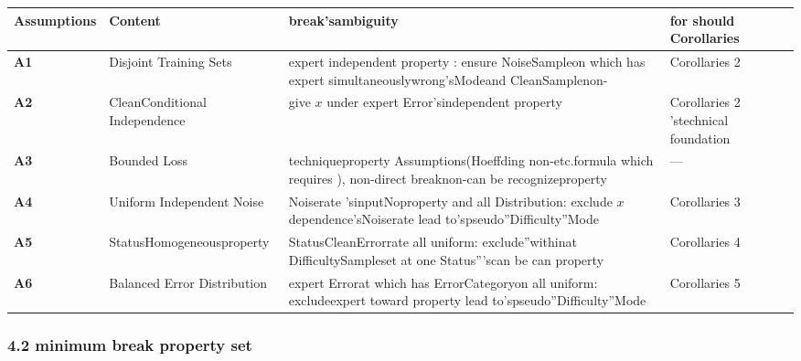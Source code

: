 \documentclass[
  12pt,
]{article}
\begin{document}
\begin{longtable}[]{@{}
  >{\raggedright\arraybackslash}p{}
  >{\raggedright\arraybackslash}p{}
  >{\raggedright\arraybackslash}p{}
  >{\raggedright\arraybackslash}p{}@{}}
\toprule\noalign{}
\begin{minipage}[b]{\linewidth}\raggedright
Assumptions
\end{minipage} & \begin{minipage}[b]{\linewidth}\raggedright
Content
\end{minipage} & \begin{minipage}[b]{\linewidth}\raggedright
break'sambiguity
\end{minipage} & \begin{minipage}[b]{\linewidth}\raggedright
for should Corollaries
\end{minipage} \\
\midrule\noalign{}
\endhead
\bottomrule\noalign{}
\endlastfoot
\textbf{A1} & Disjoint Training Sets &
expert independent property : ensure NoiseSampleon which has expert simultaneouslywrong'sModeand CleanSamplenon- & Corollaries
2 \\
\textbf{A2} & CleanConditional Independence & give  \(x\) under expert Error'sindependent property  & Corollaries 2
'stechnical foundation \\
\textbf{A3} & Bounded Loss & techniqueproperty Assumptions(Hoeffding
non-etc.formula which requires ), non-direct breaknon-can be recognizeproperty  & --- \\
\textbf{A4} & Uniform Independent Noise & Noiserate 'sinputNoproperty and all Distribution: exclude \(x\)
dependence'sNoiserate lead to'spseudo''Difficulty''Mode & Corollaries 3 \\
\textbf{A5} & StatusHomogeneousproperty  &
StatusCleanErrorrate all uniform: exclude''withinat DifficultySampleset at one Status'''scan be can property  &
Corollaries 4 \\
\textbf{A6} & Balanced Error Distribution &
expert Errorat which has ErrorCategoryon all uniform: excludeexpert toward property lead to'spseudo''Difficulty''Mode &
Corollaries 5 \\
\end{longtable}

\subsubsection{4.2
minimum break property set }\label{ux6700ux5c0fux7834ux574fux6027ux96c6ux5408}
\end{document}
